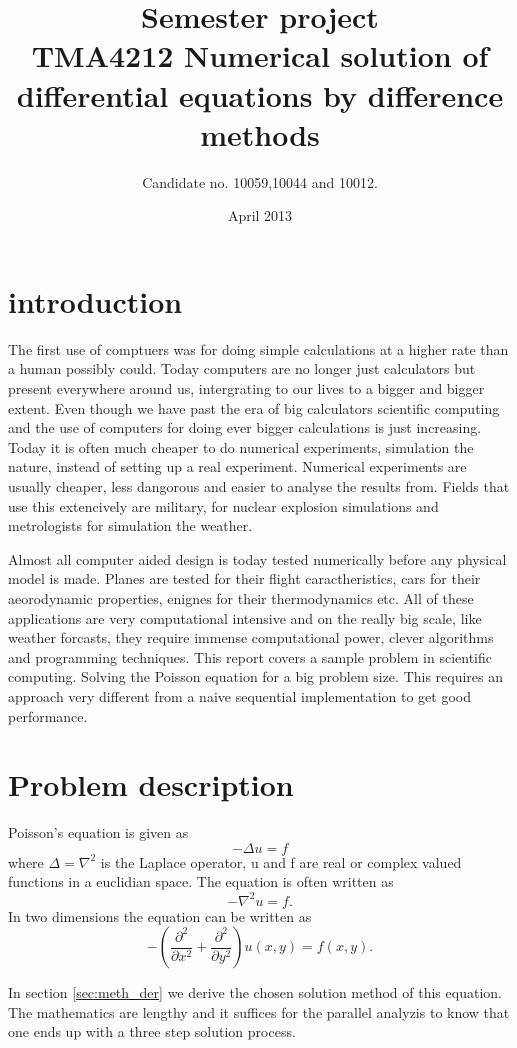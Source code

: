 \documentclass{article}
\title{Semester project \\ TMA4212 Numerical solution of differential equations by difference methods }
\author{Candidate no. 10059,10044 and 10012.}
\date{April 2013}
\begin{document}
\maketitle

\section{introduction}
The first use of comptuers was for doing simple calculations at a higher rate
than a human possibly could. Today computers are no longer just calculators but
present everywhere around us, intergrating to our lives to a bigger and bigger extent.
Even though we have past the era of big calculators scientific computing and the use
of computers for doing ever bigger calculations is just increasing. Today it is
often much cheaper to do numerical experiments, simulation the nature, instead of
setting up a real experiment. Numerical experiments are usually cheaper, less
dangorous and easier to analyse the results from. Fields that use this extencively
are military, for nuclear explosion simulations and metrologists for simulation the weather.

Almost all computer aided design is today tested numerically before any physical model is made.
Planes are tested for their flight caractheristics, cars for their aeorodynamic properties, enignes
for their thermodynamics etc. All of these applications are very computational intensive and on the
really big scale, like weather forcasts, they require immense computational power, clever algorithms
and programming techniques. This report covers a sample problem in scientific computing. Solving the
Poisson equation for a big problem size. This requires an approach very different from a naive
sequential implementation to get good performance.

\section{Problem description}
\label{sec:sol_steps}
Poisson's equation is given as
\[
-\Delta u = f
\]
where $\Delta = \nabla^2$ is the Laplace operator, u and f are real or complex valued functions in a
euclidian space. The equation is often written as
\[
-\nabla^2 u = f.
\]
In two dimensions the equation can be written as
\[
-\left( \frac{\partial^2}{\partial x^2} + \frac{\partial^2}{\partial y^2} \right) u(x,y) = f(x,y).
\]

In section \ref{sec:meth_der} we derive the chosen solution method of this equation. The mathematics are
lengthy and it suffices for the parallel analyzis to know that one ends up with a three step solution
process.
\end{document}
